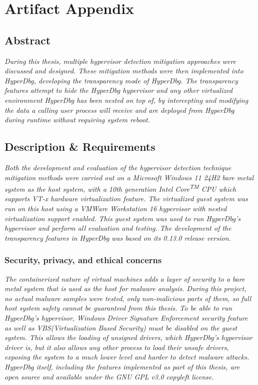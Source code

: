 
\section{Artifact Appendix}

\subsection{Abstract}
{\em During this thesis, multiple hypervisor detection mitigation approaches were discussed and designed. These mitigation methods were then implemented into HyperDbg, 
developing the transparency mode of HyperDbg. The transparency features attempt to hide the HyperDbg hypervisor and any other virtualized environment HyperDbg has been nested on top of, 
by intercepting and modifying the data a calling user process will receive and are deployed from HyperDbg during runtime without requiring system reboot.}

\subsection{Description \& Requirements}

\textit{Both the development and evaluation of the hypervisor detection technique mitigation methods were carried out
on a Microsoft Windows 11 24H2 bare metal system as the host system, with a 10th generation Intel Core\textsuperscript{TM} CPU which supports VT-x hardware virtualization feature.
The virtualized guest system was run on this host using a VMWare Workstation 16 hypervisor with nested virtualization support enabled.
This guest system was used to run HyperDbg's hypervisor and perform all evaluation and testing. The development of the transparency features in HyperDbg was based on its 0.13.0 release version. }

\subsubsection{Security, privacy, and ethical concerns}
\textit{The containerized nature of virtual machines adds a layer of security to a bare metal system that is used as the host for malware analysis.
During this project, no actual malware samples were tested, only non-malicious parts of them, so full host system safety cannot be guaranteed from this thesis.
To be able to run HyperDbg's hypervisor, Windows Driver Signature Enforcement security feature as well as VBS(Virtualization Based Security) must be disabled on the guest system.
This allows the loading of unsigned drivers, which HyperDbg's hypervisor driver is, but it also allows any other process to load their unsafe drivers, 
exposing the system to a much lower level and harder to detect malware attacks. HyperDbg itself, including the features implemented as part of this thesis, are open source and available under the GNU GPL v3.0 copyleft license.}

